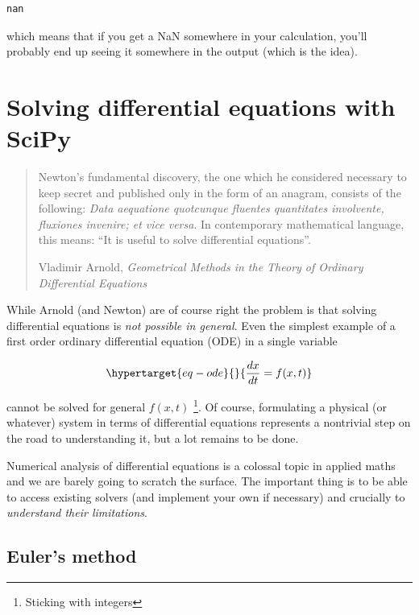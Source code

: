 \documentclass[
  letterpaper,
  DIV=11,
  numbers=noendperiod]{scrreprt}
\theoremstyle{definition}
\theoremstyle{remark}
\begin{document}
\begin{verbatim}
nan
\end{verbatim}

which means that if you get a NaN somewhere in your calculation, you'll
probably end up seeing it somewhere in the output (which is the idea).


\hypertarget{solving-differential-equations-with-scipy}{%
\chapter{Solving differential equations with
SciPy}\label{solving-differential-equations-with-scipy}}

\begin{quote}
Newton's fundamental discovery, the one which he considered necessary to
keep secret and published only in the form of an anagram, consists of
the following: \emph{Data aequatione quotcunque fluentes quantitates
involvente, fluxiones invenire; et vice versa}. In contemporary
mathematical language, this means: ``It is useful to solve differential
equations''.

Vladimir Arnold, \emph{Geometrical Methods in the Theory of Ordinary
Differential Equations}
\end{quote}

While Arnold (and Newton) are of course right the problem is that
solving differential equations is \emph{not possible in general}. Even
the simplest example of a first order ordinary differential equation
(ODE) in a single variable

\begin{equation}\protect\hypertarget{eq-ode}{}{
\frac{dx}{dt} = f(x, t)
}\label{eq-ode}\end{equation}

cannot be solved for general \(f(x,t)\) \footnote{Sticking with integers}.
Of course, formulating a physical (or whatever) system in terms of
differential equations represents a nontrivial step on the road to
understanding it, but a lot remains to be done.

Numerical analysis of differential equations is a colossal topic in
applied maths and we are barely going to scratch the surface. The
important thing is to be able to access existing solvers (and implement
your own if necessary) and crucially to \emph{understand their
limitations}.

\hypertarget{eulers-method}{%
\section{Euler's method}\label{eulers-method}}
\end{document}
